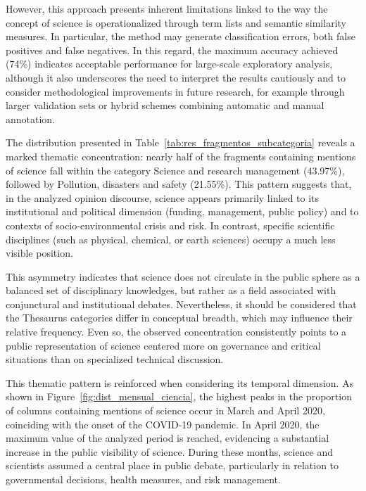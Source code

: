 \documentclass[pdflatex,sn-mathphys-num,iicol]{sn-jnl}
\begin{document}
	
	However, this approach presents inherent limitations linked to the way the concept of science is operationalized through term lists and semantic similarity measures. In particular, the method may generate classification errors, both false positives and false negatives. In this regard, the maximum accuracy achieved (74\%) indicates acceptable performance for large-scale exploratory analysis, although it also underscores the need to interpret the results cautiously and to consider methodological improvements in future research, for example through larger validation sets or hybrid schemes combining automatic and manual annotation.
	
	
	The distribution presented in Table~\ref{tab:res_fragmentos_subcategoria} reveals a marked thematic concentration: nearly half of the fragments containing mentions of science fall within the category Science and research management (43.97\%), followed by Pollution, disasters and safety (21.55\%). This pattern suggests that, in the analyzed opinion discourse, science appears primarily linked to its institutional and political dimension (funding, management, public policy) and to contexts of socio-environmental crisis and risk. In contrast, specific scientific disciplines (such as physical, chemical, or earth sciences) occupy a much less visible position.
	
	
	This asymmetry indicates that science does not circulate in the public sphere as a balanced set of disciplinary knowledges, but rather as a field associated with conjunctural and institutional debates. Nevertheless, it should be considered that the Thesaurus categories differ in conceptual breadth, which may influence their relative frequency. Even so, the observed concentration consistently points to a public representation of science centered more on governance and critical situations than on specialized technical discussion.
	
	This thematic pattern is reinforced when considering its temporal dimension. As shown in Figure~\ref{fig:dist_mensual_ciencia}, the highest peaks in the proportion of columns containing mentions of science occur in March and April 2020, coinciding with the onset of the COVID-19 pandemic. In April 2020, the maximum value of the analyzed period is reached, evidencing a substantial increase in the public visibility of science. During these months, science and scientists assumed a central place in public debate, particularly in relation to governmental decisions, health measures, and risk management.
	
\end{document}
